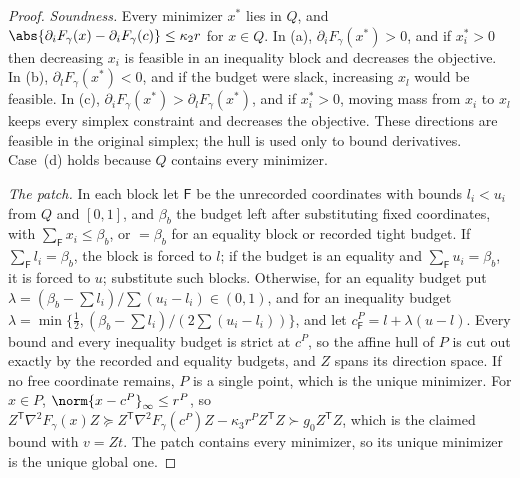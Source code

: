\begin{proof}
\emph{Soundness.} Every minimizer $x^*$ lies in $Q$, and
$\abs{\partial_iF_\gamma(x)-\partial_iF_\gamma(c)}\le\kappa_2r$ for $x\in Q$. In
(a), $\partial_iF_\gamma(x^*)>0$, and if $x_i^*>0$ then decreasing $x_i$ is
feasible in an inequality block and decreases the objective. In (b),
$\partial_lF_\gamma(x^*)<0$, and if the budget were slack, increasing $x_l$
would be feasible. In (c), $\partial_iF_\gamma(x^*)>\partial_lF_\gamma(x^*)$,
and if $x_i^*>0$, moving mass from $x_i$ to $x_l$ keeps every simplex
constraint and decreases the objective. These directions are feasible in the
original simplex; the hull is used only to bound derivatives. Case~(d) holds
because $Q$ contains every minimizer.

\emph{The patch.} In each block let $\mathsf F$ be the unrecorded coordinates
with bounds $l_i<u_i$ from $Q$ and $[0,1]$, and $\beta_b$ the budget left
after substituting fixed coordinates, with $\sum_{\mathsf F}x_i\le\beta_b$, or
$=\beta_b$ for an equality block or recorded tight budget. If
$\sum_{\mathsf F}l_i=\beta_b$, the block is forced to $l$; if the budget is an
equality and $\sum_{\mathsf F}u_i=\beta_b$, it is forced to $u$; substitute
such blocks. Otherwise, for an equality budget put
$\lambda=(\beta_b-\sum l_i)/\sum(u_i-l_i)\in(0,1)$, and for an inequality
budget $\lambda=\min\{\frac12,(\beta_b-\sum l_i)/(2\sum(u_i-l_i))\}$, and let
$c^P_{\mathsf F}=l+\lambda(u-l)$. Every bound and every inequality budget is
strict at $c^P$, so the affine hull of $P$ is cut out exactly by the
recorded and equality budgets, and $Z$ spans its direction space. If no free
coordinate remains, $P$ is a single point, which is the unique minimizer.
For $x\in P$, $\norm{x-c^P}_\infty\le r^P$, so
$Z^{\mathsf T}\nabla^2F_\gamma(x)Z\succeq Z^{\mathsf T}\nabla^2F_\gamma(c^P)Z
-\kappa_3r^PZ^{\mathsf T}Z\succ g_0Z^{\mathsf T}Z$, which is the claimed bound
with $v=Zt$. The patch contains every minimizer, so its unique minimizer is
the unique global one.


\end{proof}
